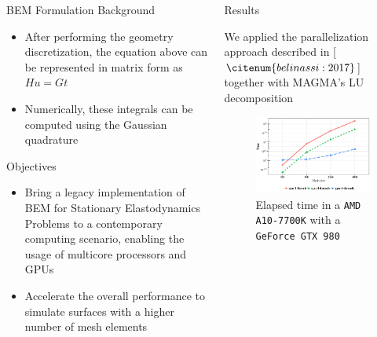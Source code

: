 \documentclass{beamer}
\begin{document}
\begin{frame}[fragile]
\begin{columns}[T]
\begin{column}{.46\textwidth}
\begin{block}{BEM Formulation Background}
\begin{itemize}
\item After performing the geometry discretization, the equation above can be represented in matrix form as $Hu = Gt$
\item Numerically, these integrals can be computed using the Gaussian quadrature

\end{itemize}
\end{block}

\begin{block}{Objectives}\justifying
\begin{itemize}

\item Bring a legacy implementation of BEM for Stationary Elastodynamics Problems to a contemporary computing scenario, enabling the usage of multicore processors and GPUs
\item Accelerate the overall performance to simulate surfaces with a higher number of mesh elements

\end{itemize}
\end{block}

\end{column}

\begin{column}{.46\textwidth}



\begin{block}{Results}

We applied the parallelization approach described in [$\citenum{belinassi:2017}$] together with MAGMA's LU decomposition

\begin{figure}
	\centering
	\includegraphics[scale=1.4]{venus_total.pdf}
	\caption{Elapsed time in a \texttt{AMD A10-7700K} with a \texttt{GeForce GTX 980}}
	\label{fig:venus}
\end{figure}


\end{block}
\end{column}
\end{columns}
\end{frame}
\end{document}
